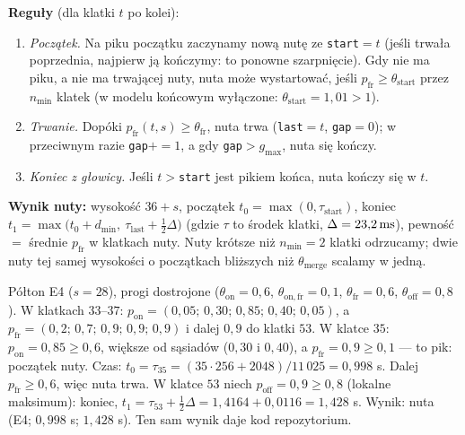 \textbf{Reguły} (dla klatki $t$ po kolei):
\begin{enumerate}
\item \emph{Początek.} Na piku początku zaczynamy nową nutę ze \texttt{start}$=t$ (jeśli trwała poprzednia, najpierw ją kończymy: to ponowne szarpnięcie). Gdy nie ma piku, a nie ma trwającej nuty, nuta może wystartować, jeśli $p_\mathrm{fr}\ge\theta_\mathrm{start}$ przez $n_\mathrm{min}$ klatek (w modelu końcowym wyłączone: $\theta_\mathrm{start}=1{,}01>1$).
\item \emph{Trwanie.} Dopóki $p_\mathrm{fr}(t,s)\ge\theta_\mathrm{fr}$, nuta trwa (\texttt{last}$=t$, \texttt{gap}$=0$); w przeciwnym razie \texttt{gap}$\mathrel{+}=1$, a gdy \texttt{gap}$>g_\mathrm{max}$, nuta się kończy.
\item \emph{Koniec z głowicy.} Jeśli $t>$\texttt{start} jest pikiem końca, nuta kończy się w $t$.
\end{enumerate}
\textbf{Wynik nuty:} wysokość $36+s$, początek $t_0=\max(0,\tau_\text{start})$, koniec $t_1=\max\big(t_0+d_\mathrm{min},\ \tau_\text{last}+\tfrac12\Delta\big)$ (gdzie $\tau$ to środek klatki, $\Delta=23{,}2\,\mathrm{ms}$), pewność $=$ średnie $p_\mathrm{fr}$ w klatkach nuty.
Nuty krótsze niż $n_\mathrm{min}=2$ klatki odrzucamy; dwie nuty tej samej wysokości o początkach bliższych niż $\theta_\mathrm{merge}$ scalamy w jedną.

\begin{przyklad}\label{prz:dekoder-reczny}
Półton E4 ($s=28$), progi dostrojone ($\theta_\mathrm{on}=0{,}6$, $\theta_\mathrm{on,fr}=0{,}1$, $\theta_\mathrm{fr}=0{,}6$, $\theta_\mathrm{off}=0{,}8$). W klatkach $33$--$37$:
$p_\mathrm{on}=(0{,}05;\,0{,}30;\,0{,}85;\,0{,}40;\,0{,}05)$, a $p_\mathrm{fr}=(0{,}2;\,0{,}7;\,0{,}9;\,0{,}9;\,0{,}9)$ i dalej $0{,}9$ do klatki $53$. W klatce $35$: $p_\mathrm{on}=0{,}85\ge0{,}6$, większe od sąsiadów ($0{,}30$ i $0{,}40$), a $p_\mathrm{fr}=0{,}9\ge0{,}1$ --- to pik: początek nuty.
Czas: $t_0=\tau_{35}=(35\cdot256+2048)/11\,025=0{,}998$ s. Dalej $p_\mathrm{fr}\ge0{,}6$, więc nuta trwa. W klatce $53$ niech $p_\mathrm{off}=0{,}9\ge0{,}8$ (lokalne maksimum): koniec, $t_1=\tau_{53}+\tfrac12\Delta=1{,}4164+0{,}0116=1{,}428$ s.
Wynik: nuta (E4; $0{,}998$ s; $1{,}428$ s). Ten sam wynik daje kod repozytorium.
\end{przyklad}

